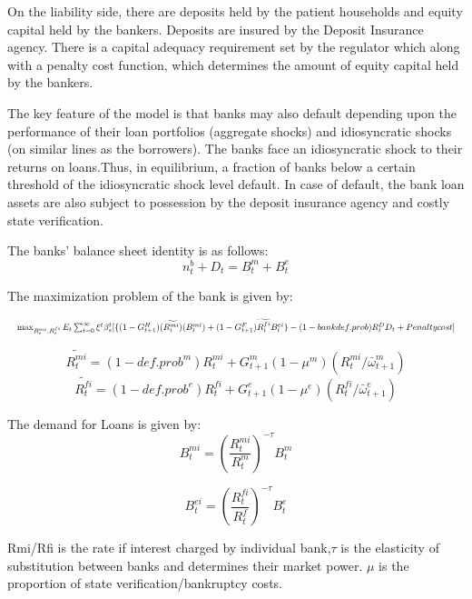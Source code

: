 \documentclass[12pt]{article}
\numberwithin{equation}{section}
\begin{document}
\begin{appendix}
On the liability side, there are deposits held by the patient households and equity capital held by the bankers. Deposits are insured by the Deposit Insurance agency. There is a capital adequacy requirement set by the regulator which along with a penalty cost function, which determines the amount of equity capital held by the bankers.

The key feature of the model is that banks may also default depending upon the performance of their loan portfolios (aggregate shocks) and idiosyncratic shocks (on similar lines as  the borrowers). The banks face an idiosyncratic shock to their returns on loans.Thus, in equilibrium, a fraction of banks below a certain threshold of the idiosyncratic shock level default. In case of default, the bank loan assets are also subject to possession  by the deposit insurance agency and costly state verification.

The banks' balance sheet identity is as follows:
\begin{equation}
n^b_{t}+D_{t}=B^m_{t}+B^e_{t}
\end{equation}

The maximization problem of the bank is given by:

\begin{equation}
\resizebox{1\textwidth}{!}{$
	\max_{R^{mi}_t,R^{fi}_t}E_t\sum _{t=0}^{\infty }\xi^t\beta_{s}^t [\{(1-G^H_{t+1}) (\widetilde{R^{mi}_{t}})(B^{mi}_{t})+(1-G^F_{t+1})\widetilde{R^{fi}_{t}}B^{ei}_{t}\}-(1-bankdef.prob){R^D_{t}}D_{t}+Penalty cost]$}
\end{equation}



\begin{equation}
\widetilde{R^{mi}_{t}}=(1-def.prob^m)R^{mi}_t+G^m_{t+1}(1 - \mu^m)( R^{mi}_t/\bar{\omega}^m_{t+1})
\end{equation}
\begin{equation}
\widetilde{R^{fi}_{t}}=(1-def.prob^e)R^{fi}_t+G^e_{t+1}(1 - \mu^e)( R^{fi}_t/\bar{\omega}^e_{t+1})
\end{equation}

The demand for Loans is given by:
\begin{equation}
B^{mi}_t=(\frac{R^{mi}_t}{R^{m}_t})^{-\tau} B^{m}_t
\end{equation}

\begin{equation}
B^{ei}_t=(\frac{R^{fi}_t}{R^{f}_t})^{-\tau} B^{e}_t
\end{equation}


Rmi/Rfi is the rate if interest charged by individual bank,$\tau$ is the elasticity of substitution between banks and determines their market power. $\mu$ is the proportion of state verification/bankruptcy costs.


\end{appendix}
\end{document}
